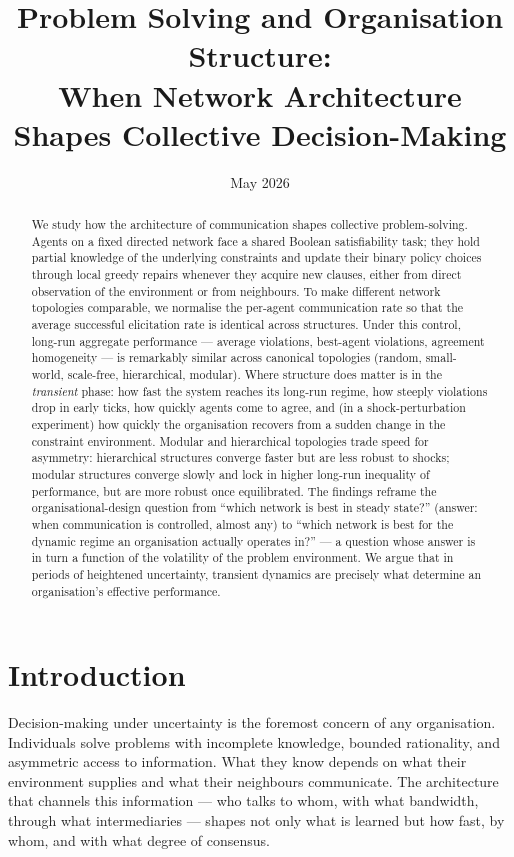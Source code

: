 \documentclass{article}
\title{Problem Solving and Organisation Structure: \\ When Network Architecture Shapes Collective Decision-Making}
\author{}
\date{May 2026}
\begin{document}
\maketitle

\begin{abstract}
We study how the architecture of communication shapes collective problem-solving. Agents on a fixed directed network face a shared Boolean satisfiability task; they hold partial knowledge of the underlying constraints and update their binary policy choices through local greedy repairs whenever they acquire new clauses, either from direct observation of the environment or from neighbours. To make different network topologies comparable, we normalise the per-agent communication rate so that the average successful elicitation rate is identical across structures. Under this control, long-run aggregate performance --- average violations, best-agent violations, agreement homogeneity --- is remarkably similar across canonical topologies (random, small-world, scale-free, hierarchical, modular). Where structure does matter is in the \emph{transient} phase: how fast the system reaches its long-run regime, how steeply violations drop in early ticks, how quickly agents come to agree, and (in a shock-perturbation experiment) how quickly the organisation recovers from a sudden change in the constraint environment. Modular and hierarchical topologies trade speed for asymmetry: hierarchical structures converge faster but are less robust to shocks; modular structures converge slowly and lock in higher long-run inequality of performance, but are more robust once equilibrated. The findings reframe the organisational-design question from ``which network is best in steady state?'' (answer: when communication is controlled, almost any) to ``which network is best for the dynamic regime an organisation actually operates in?'' --- a question whose answer is in turn a function of the volatility of the problem environment. We argue that in periods of heightened uncertainty, transient dynamics are precisely what determine an organisation's effective performance.
\end{abstract}


\section{Introduction}\label{sec:intro}

Decision-making under uncertainty is the foremost concern of any organisation. Individuals solve problems with incomplete knowledge, bounded rationality, and asymmetric access to information. What they know depends on what their environment supplies and what their neighbours communicate. The architecture that channels this information --- who talks to whom, with what bandwidth, through what intermediaries --- shapes not only what is learned but how fast, by whom, and with what degree of consensus.
\end{document}
